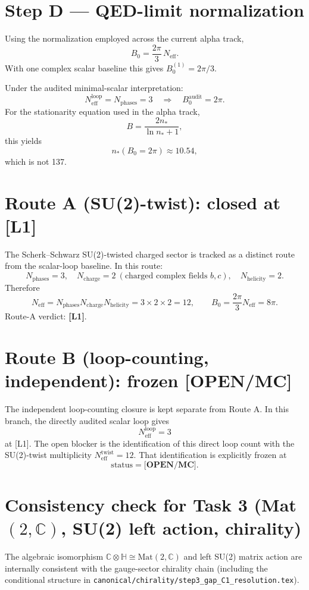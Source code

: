\documentclass[12pt,a4paper]{article}
\begin{document}
\section{Step D --- QED-limit normalization}
Using the normalization employed across the current alpha track,
\begin{equation}
B_0=\frac{2\pi}{3}\,N_{\mathrm{eff}}.
\end{equation}
With one complex scalar baseline this gives $B_0^{(1)}=2\pi/3$.

Under the audited minimal-scalar interpretation:
\begin{equation}
N_{\mathrm{eff}}^{\mathrm{loop}}=N_{\mathrm{phases}}=3
\quad\Rightarrow\quad
B_0^{\mathrm{audit}}=2\pi.
\end{equation}
For the stationarity equation used in the alpha track,
\begin{equation}
B=\frac{2n_*}{\ln n_*+1},
\end{equation}
this yields
\begin{equation}
n_*(B_0=2\pi)\approx 10.54,
\end{equation}
which is not 137.

\section{Route A (SU(2)-twist): closed at [L1]}
The Scherk--Schwarz SU(2)-twisted charged sector is tracked as a distinct route
from the scalar-loop baseline. In this route:
\[
N_{\mathrm{phases}}=3,\quad
N_{\mathrm{charge}}=2\ (\text{charged complex fields } b,c),\quad
N_{\mathrm{helicity}}=2.
\]
Therefore
\[
N_{\mathrm{eff}}=N_{\mathrm{phases}}N_{\mathrm{charge}}N_{\mathrm{helicity}}
=3\times2\times2=12,\qquad
B_0=\frac{2\pi}{3}N_{\mathrm{eff}}=8\pi.
\]
Route-A verdict: \textbf{[L1]}.

\section{Route B (loop-counting, independent): frozen [OPEN/MC]}
The independent loop-counting closure is kept separate from Route A.
In this branch, the directly audited scalar loop gives
\[
N_{\mathrm{eff}}^{\mathrm{loop}} = 3
\]
at [L1].  The open blocker is the identification of this direct loop count
with the SU(2)-twist multiplicity $N_{\mathrm{eff}}^{\mathrm{twist}} = 12$.
That identification is explicitly frozen at
\[
\text{status}=\textbf{[OPEN/MC]}.
\]

\section{Consistency check for Task 3 (Mat$(2,\mathbb{C})$, SU(2) left action, chirality)}
The algebraic isomorphism $\mathbb{C}\otimes\mathbb{H}\cong\mathrm{Mat}(2,\mathbb{C})$
and left SU(2) matrix action are internally consistent with the gauge-sector
chirality chain (including the conditional structure in
\texttt{canonical/chirality/step3\_gap\_C1\_resolution.tex}).
\end{document}
